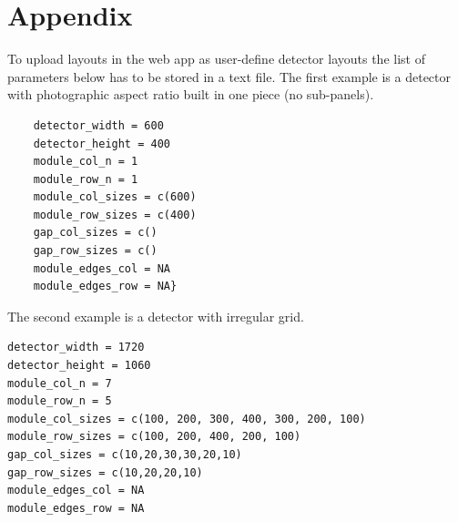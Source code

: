 \documentclass[11pt,a4paper]{article}
\begin{document}
\section{Appendix}\label{appendix}

To upload layouts in the web app as user-define detector layouts the list of parameters below has to be stored in a text file. The first example is a detector with photographic aspect ratio built in one piece (no sub-panels). 

\begin{verbatim}
	detector_width = 600
	detector_height = 400
	module_col_n = 1
	module_row_n = 1
	module_col_sizes = c(600)
	module_row_sizes = c(400)
	gap_col_sizes = c()
	gap_row_sizes = c()
	module_edges_col = NA
	module_edges_row = NA}
\end{verbatim}
	
The second example is a detector with irregular grid. 

\begin{verbatim}
detector_width = 1720
detector_height = 1060
module_col_n = 7
module_row_n = 5
module_col_sizes = c(100, 200, 300, 400, 300, 200, 100)
module_row_sizes = c(100, 200, 400, 200, 100)
gap_col_sizes = c(10,20,30,30,20,10)
gap_row_sizes = c(10,20,20,10)
module_edges_col = NA
module_edges_row = NA
\end{verbatim}
\end{document}
